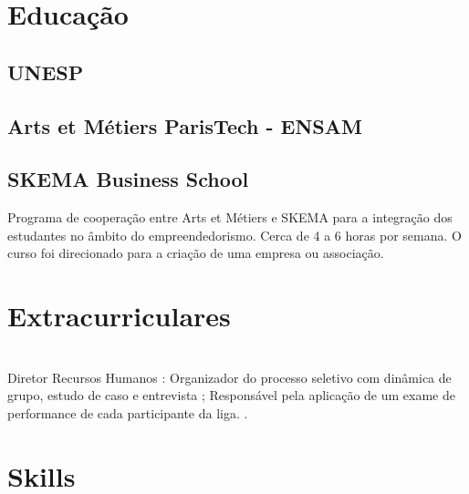 \documentclass[]{deedy-resume-openfont}
\begin{document}
\begin{minipage}[t]{0.46\textwidth} 



\section{Educação} 

\subsection{UNESP}
\sectionsep

\subsection{Arts et Métiers ParisTech - ENSAM}
\sectionsep

\subsection{SKEMA Business School}
Programa de cooperação entre Arts et Métiers e SKEMA para a integração dos estudantes no âmbito do empreendedorismo. Cerca de 4 a 6 horas por semana. O curso foi direcionado para a criação de uma empresa ou associação.
\sectionsep




\section{Extracurriculares}
 \\
Diretor Recursos Humanos : Organizador do processo seletivo com dinâmica de grupo, estudo de caso e entrevista ; Responsável pela aplicação de um exame de performance de cada participante da liga. .  
\sectionsep


\section{Skills}

\end{minipage}
\end{document}
